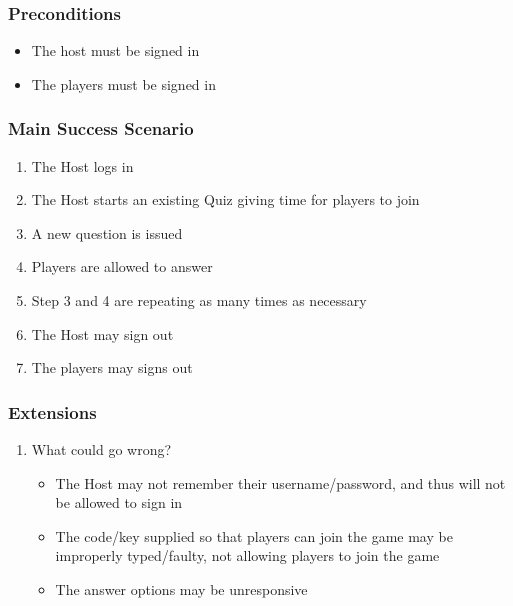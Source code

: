 \documentclass[a4paper]{article}
\begin{document}
	\subsubsection{Preconditions}
	\begin{itemize}
		\item The host must be signed in
		\item The players must be signed in
	\end{itemize}
	\subsubsection{Main Success Scenario}
	\begin{enumerate}
		\item The Host logs in
		\item The Host starts an existing Quiz giving time for players to join
		\item A new question is issued
		\item Players are allowed to answer
		\item Step 3 and 4 are repeating as many times as necessary
		\item The Host may sign out
		\item The players may signs out
	\end{enumerate}
	\subsubsection{Extensions}
	\begin{enumerate}
		\item What could go wrong?
		\begin{itemize}
			\item The Host may not remember their username/password, and thus will not be allowed to sign in
			\item The code/key supplied so that players can join the game may be improperly typed/faulty, not allowing
			players to join the game
			\item The answer options may be unresponsive
		\end{itemize}
	\end{enumerate}
	
	\newpage
\end{document}
